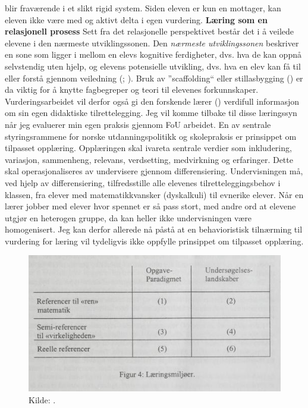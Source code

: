 \documentclass[main.tex]{subfiles}
\begin{document}
blir fraværende i et slikt rigid system. Siden eleven er kun en mottager, kan eleven ikke være med og aktivt delta i 
egen vurdering. 
\newline
\newline
\textbf{Læring som en relasjonell prosess}
\newline
Sett fra det relasjonelle perspektivet består det i å veilede elevene i den nærmeste utviklingssonen.
Den \emph{nærmeste utviklingssonen} beskriver en sone som ligger i mellom en elevs kognitive 
ferdigheter, dvs. hva de kan oppnå selvstendig uten hjelp, og elevens potensielle utvikling, dvs. 
hva en elev kan få til eller forstå gjennom veiledning (; ). 
Bruk av ''scaffolding`` eller stillasbygging () er da viktig for å knytte fagbegreper og teori til elevenes 
forkunnskaper. Vurderingsarbeidet vil derfor også gi den forskende lærer () verdifull informasjon 
om sin egen didaktiske tilrettelegging.
Jeg vil komme tilbake til disse læringssyn når jeg evaluerer min egen praksis gjennom FoU arbeidet.
\newline
\newline
En av sentrale styringsrammene for norske utdanningspolitikk og skolepraksis er prinsippet om tilpasset opplæring.
Opplæringen skal ivareta sentrale verdier som inkludering, variasjon, sammenheng, relevans, verdsetting, medvirkning og 
erfaringer. Dette skal operasjonaliseres av undervisere gjennom differensiering.  Undervisningen må, ved hjelp av 
differensiering, tilfredsstille alle elevenes tilretteleggingsbehov i klassen, fra elever med matematikkvansker 
(dyskalkuli) til evnerike elever. Når en lærer jobber med elever hvor spennet er så pass stort, med andre ord at elevene 
utgjør en heterogen gruppe, da kan heller ikke undervisningen være homogenisert. Jeg kan derfor allerede nå påstå at en 
behavioristisk tilnærming til vurdering for læring vil tydeligvis ikke oppfylle prinsippet om tilpasset opplæring.
\newline
\newline
\begin{figure}[h!]
\centering
\includegraphics[scale = 0.9]{../figures/laeringsmiljoer.png}
\caption{Kilde: \protect{}.}
\label{fig:skov98}
\end{figure}
\end{document}
